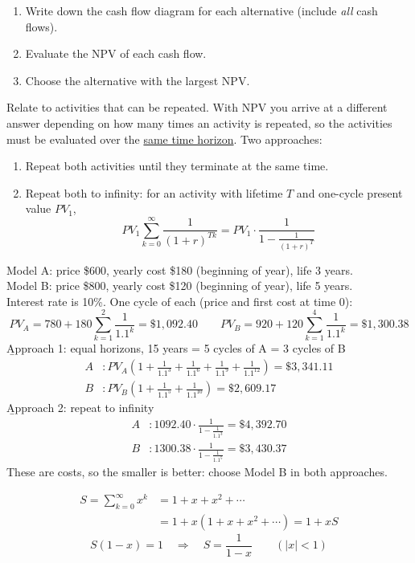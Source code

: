\begin{enumerate}
    \item Write down the cash flow diagram for each alternative (include \textit{all} cash flows).
    \item Evaluate the NPV of each cash flow.
    \item Choose the alternative with the largest NPV.
\end{enumerate}

Relate to activities that can be repeated. With NPV you arrive at a different answer depending on how many times an activity is repeated, so the activities must be evaluated over the \underline{same time horizon}. Two approaches:
\begin{enumerate}
    \item Repeat both activities until they terminate at the same time.
    \item Repeat both to infinity: for an activity with lifetime $T$ and one-cycle present value $PV_1$,
    \[PV_1\sum_{k=0}^{\infty}\frac{1}{(1+r)^{Tk}} = PV_1\cdot\frac{1}{1-\frac{1}{(1+r)^T}}\]
\end{enumerate}

\begin{example}
    Model A: price \$600, yearly cost \$180 (beginning of year), life 3 years.
    \\Model B: price \$800, yearly cost \$120 (beginning of year), life 5 years.
    \\Interest rate is 10\%. One cycle of each (price and first cost at time 0):
    \[PV_A = 780 + 180\sum_{k=1}^{2}\frac{1}{1.1^k} = \$1,092.40 \qquad PV_B = 920 + 120\sum_{k=1}^{4}\frac{1}{1.1^k} = \$1,300.38\]
    \b{Approach 1}: equal horizons, 15 years = 5 cycles of A = 3 cycles of B
    \begin{align*}
        A&: PV_A\left(1+\frac{1}{1.1^3}+\frac{1}{1.1^6}+\frac{1}{1.1^9}+\frac{1}{1.1^{12}}\right) = \$3,341.11\\
        B&: PV_B\left(1+\frac{1}{1.1^5}+\frac{1}{1.1^{10}}\right) = \$2,609.17
    \end{align*}
    \b{Approach 2}: repeat to infinity
    \begin{align*}
        A&: 1092.40\cdot\frac{1}{1-\frac{1}{1.1^3}} = \$4,392.70\\
        B&: 1300.38\cdot\frac{1}{1-\frac{1}{1.1^5}} = \$3,430.37
    \end{align*}
    These are costs, so the smaller is better: choose Model B in both approaches.
\end{example}

\begin{align*}
    S = \sum_{k=0}^{\infty}x^k &= 1 + x + x^2 + \cdots\\
    &= 1 + x(1+x+x^2+\cdots) = 1 + xS
\end{align*}
\[S(1-x) = 1 \quad \Rightarrow \quad S = \frac{1}{1-x} \qquad (|x|<1)\]